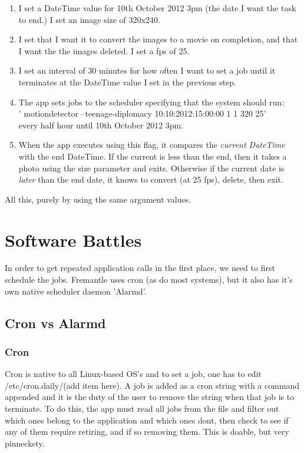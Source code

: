 \documentclass[11pt]{article} %
\begin{document}
\begin{enumerate}
\item I set a DateTime value for 10th October 2012 3pm (the date I want the task to end.)  I set an image size of 320x240.\\
\vspace{-20pt}
\item I set that I want it to convert the images to a movie on completion, and that I want the the images deleted. I set a fps of 25.\\
\vspace{-20pt}
\item I set an interval of 30 minutes for how often I want to set a job until it terminates at the DateTime value I set in the previous step.\\
\vspace{-20pt}
\item The app sets jobs to the scheduler specifying that the system should run:\\
 ' motiondetector --teenage-diplomacy 10:10:2012:15:00:00   1  1  320 25' \\
every half hour until 10th October 2012 3pm.
\vspace{-8pt}
\item When the app executes using this flag, it compares the {\it current DateTime} with the end DateTime. If the current is less than the end, then it takes a photo using the size parameter and exits. Otherwise if the current date is {\it later} than the end date, it knows to convert (at 25 fps), delete, then exit.
\end{enumerate}
All this, purely by using the same argument values.

\section{Software Battles}
In order to get repeated application calls in the first place, we need to first schedule the jobs. Fremantle uses cron (as do most systems), but it also has it's own native scheduler daemon 'Alarmd'.

\subsection{Cron vs Alarmd}
\subsubsection{Cron}

Cron is native to all Linux-based OS's and to set a job, one has to edit /etc/cron.daily/(add item here).  A job is added as a cron string with a command appended and it is the duty of the user to remove the string when that job is to terminate. To do this, the app must read all jobs from the file and filter out which ones belong to the application and which ones dont, then check to see if any of them require retiring, and if so removing them. This is doable, but very pinneckety.
\end{document}
